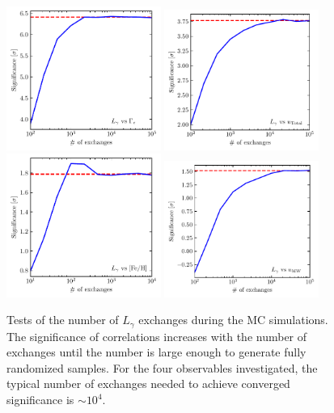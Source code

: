 \documentclass[doublespace,draft,nopageskip]{VTthesis} %
\begin{document}
\begin{appendices}
\begin{figure}
    \centering
    \includegraphics[width=0.45\textwidth]{Figures/Globular/kendall/kendall_vs_encounter_rate.pdf}
    \includegraphics[width=0.45\textwidth]{Figures/Globular/kendall/kendall_vs_total_radiation.pdf}
    \includegraphics[width=0.45\textwidth]{Figures/Globular/kendall/kendall_vs_metallicity.pdf}
    \includegraphics[width=0.45\textwidth]{Figures/Globular/kendall/kendall_vs_isrf_radiation.pdf}
    \caption{Tests of the number of $L_\gamma$ exchanges during the MC simulations. The significance of correlations increases with the number of exchanges until the number is large enough to generate fully randomized samples. For the four observables investigated, the typical number of exchanges needed to achieve converged significance is $\sim 10^4$.}
    \label{fig:exchange}
\end{figure}


\end{appendices}
\end{document}
